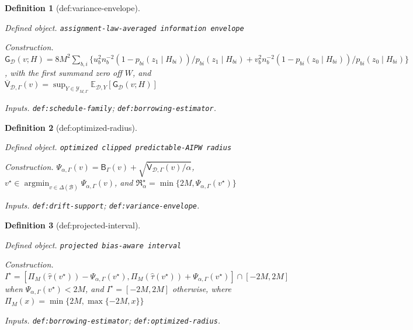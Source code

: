 \documentclass{article}
\newtheorem{definition}{Definition}
\begin{document}
\begin{definition}[def:variance-envelope]\label{def:variance-envelope}
\par\smallskip\noindent\emph{Defined object.} \texttt{assignment-\allowbreak{}law-\allowbreak{}averaged information envelope}
\par\smallskip\noindent\emph{Construction.} \(\mathsf G_{\mathcal D}(v;H)=8M^2\sum_{b,i}\{u_b^2n_b^{-2}(1-p_{bi}(z_1\mid H_{bi}))/p_{bi}(z_1\mid H_{bi})+v_b^2n_b^{-2}(1-p_{bi}(z_0\mid H_{bi}))/p_{bi}(z_0\mid H_{bi})\}\), with the first summand zero off \(W\), and \(\overline{\mathsf V}_{\mathcal D,\Gamma}(v)=\sup_{Y\in\mathcal Y_{M,\Gamma}}\mathbb E_{\mathcal D,Y}[\mathsf G_{\mathcal D}(v;H)]\)
\par\smallskip\noindent\emph{Inputs.} \texttt{def:\allowbreak{}schedule-\allowbreak{}family}; \texttt{def:\allowbreak{}borrowing-\allowbreak{}estimator}.
\end{definition}

\begin{definition}[def:optimized-radius]\label{def:optimized-radius}
\par\smallskip\noindent\emph{Defined object.} \texttt{optimized clipped predictable-\allowbreak{}AIPW radius}
\par\smallskip\noindent\emph{Construction.} \(\Psi_{\alpha,\Gamma}(v)=\mathsf B_\Gamma(v)+\sqrt{\overline{\mathsf V}_{\mathcal D,\Gamma}(v)/\alpha}\), \(v^\star\in\operatorname*{argmin}_{v\in\Delta(\mathcal B)}\Psi_{\alpha,\Gamma}(v)\), and \(\mathfrak R_\alpha^\star=\min\{2M,\Psi_{\alpha,\Gamma}(v^\star)\}\)
\par\smallskip\noindent\emph{Inputs.} \texttt{def:\allowbreak{}drift-\allowbreak{}support}; \texttt{def:\allowbreak{}variance-\allowbreak{}envelope}.
\end{definition}

\begin{definition}[def:projected-interval]\label{def:projected-interval}
\par\smallskip\noindent\emph{Defined object.} \texttt{projected bias-\allowbreak{}aware interval}
\par\smallskip\noindent\emph{Construction.} \(I^\star=[\Pi_M(\widehat\tau(v^\star))-\Psi_{\alpha,\Gamma}(v^\star),\Pi_M(\widehat\tau(v^\star))+\Psi_{\alpha,\Gamma}(v^\star)]\cap[-2M,2M]\) when \(\Psi_{\alpha,\Gamma}(v^\star)<2M\), and \(I^\star=[-2M,2M]\) otherwise, where \(\Pi_M(x)=\min\{2M,\max\{-2M,x\}\}\)
\par\smallskip\noindent\emph{Inputs.} \texttt{def:\allowbreak{}borrowing-\allowbreak{}estimator}; \texttt{def:\allowbreak{}optimized-\allowbreak{}radius}.
\end{definition}
\end{document}
